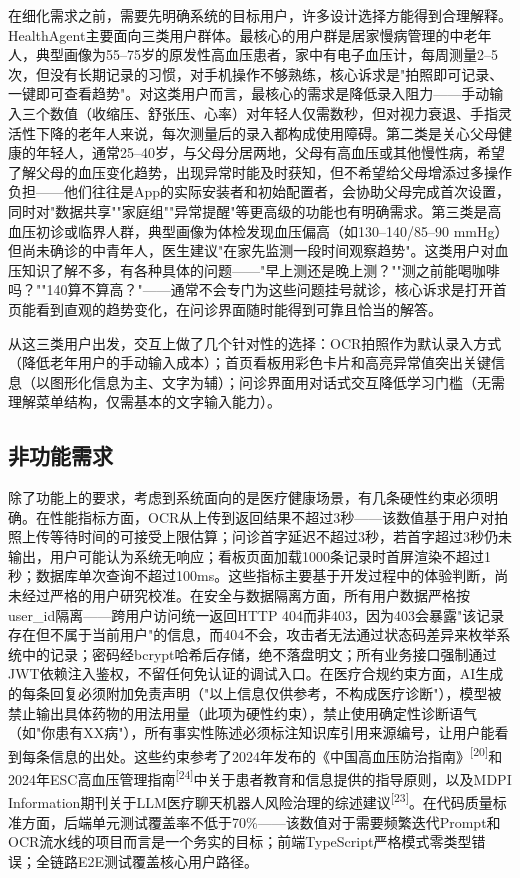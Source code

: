 \documentclass[zihao=-4,a4paper]{ctexart}
\begin{document}
在细化需求之前，需要先明确系统的目标用户，许多设计选择方能得到合理解释。HealthAgent主要面向三类用户群体。最核心的用户群是居家慢病管理的中老年人，典型画像为55--75岁的原发性高血压患者，家中有电子血压计，每周测量2--5次，但没有长期记录的习惯，对手机操作不够熟练，核心诉求是"拍照即可记录、一键即可查看趋势"。对这类用户而言，最核心的需求是降低录入阻力——手动输入三个数值（收缩压、舒张压、心率）对年轻人仅需数秒，但对视力衰退、手指灵活性下降的老年人来说，每次测量后的录入都构成使用障碍。第二类是关心父母健康的年轻人，通常25--40岁，与父母分居两地，父母有高血压或其他慢性病，希望了解父母的血压变化趋势，出现异常时能及时获知，但不希望给父母增添过多操作负担——他们往往是App的实际安装者和初始配置者，会协助父母完成首次设置，同时对"数据共享""家庭组""异常提醒"等更高级的功能也有明确需求。第三类是高血压初诊或临界人群，典型画像为体检发现血压偏高（如130--140/85--90 mmHg）但尚未确诊的中青年人，医生建议"在家先监测一段时间观察趋势"。这类用户对血压知识了解不多，有各种具体的问题——"早上测还是晚上测？""测之前能喝咖啡吗？""140算不算高？"——通常不会专门为这些问题挂号就诊，核心诉求是打开首页能看到直观的趋势变化，在问诊界面随时能得到可靠且恰当的解答。

从这三类用户出发，交互上做了几个针对性的选择：OCR拍照作为默认录入方式（降低老年用户的手动输入成本）；首页看板用彩色卡片和高亮异常值突出关键信息（以图形化信息为主、文字为辅）；问诊界面用对话式交互降低学习门槛（无需理解菜单结构，仅需基本的文字输入能力）。

\subsection{非功能需求}

除了功能上的要求，考虑到系统面向的是医疗健康场景，有几条硬性约束必须明确。在性能指标方面，OCR从上传到返回结果不超过3秒——该数值基于用户对拍照上传等待时间的可接受上限估算；问诊首字延迟不超过3秒，若首字超过3秒仍未输出，用户可能认为系统无响应；看板页面加载1000条记录时首屏渲染不超过1秒；数据库单次查询不超过100ms。这些指标主要基于开发过程中的体验判断，尚未经过严格的用户研究校准。在安全与数据隔离方面，所有用户数据严格按user\_id隔离——跨用户访问统一返回HTTP 404而非403，因为403会暴露"该记录存在但不属于当前用户"的信息，而404不会，攻击者无法通过状态码差异来枚举系统中的记录；密码经bcrypt哈希后存储，绝不落盘明文；所有业务接口强制通过JWT依赖注入鉴权，不留任何免认证的调试入口。在医疗合规约束方面，AI生成的每条回复必须附加免责声明（"以上信息仅供参考，不构成医疗诊断"），模型被禁止输出具体药物的用法用量（此项为硬性约束），禁止使用确定性诊断语气（如"你患有XX病"），所有事实性陈述必须标注知识库引用来源编号，让用户能看到每条信息的出处。这些约束参考了2024年发布的《中国高血压防治指南》\textsuperscript{[20]}和2024年ESC高血压管理指南\textsuperscript{[24]}中关于患者教育和信息提供的指导原则，以及MDPI Information期刊关于LLM医疗聊天机器人风险治理的综述建议\textsuperscript{[23]}。在代码质量标准方面，后端单元测试覆盖率不低于70\%——该数值对于需要频繁迭代Prompt和OCR流水线的项目而言是一个务实的目标；前端TypeScript严格模式零类型错误；全链路E2E测试覆盖核心用户路径。
\end{document}
